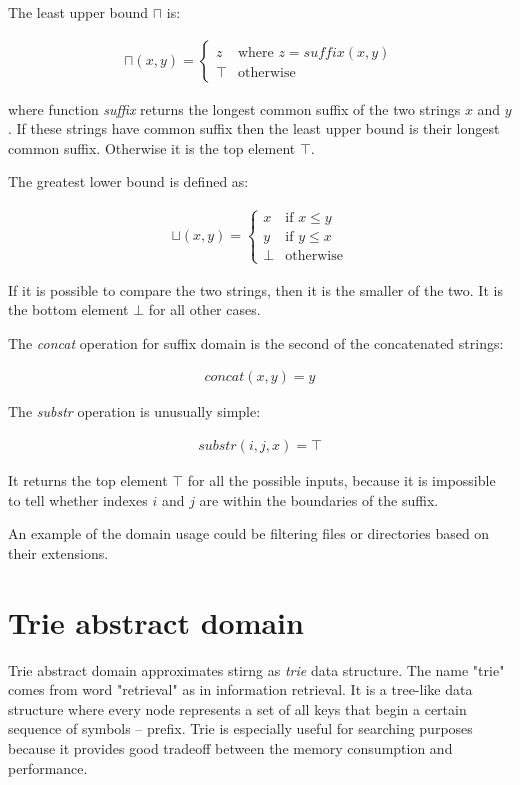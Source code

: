 \documentclass[12pt,final,oneside]{fithesis2}
\theoremstyle{definition}
\begin{document}
The least upper bound $\sqcap$ is:

\begin{align*}
\sqcap (x, y) =
\begin{cases}
z    & \text{where } z = \textit{suffix}(x,  y) \\
\top & \text{otherwise}
\end{cases}
\end{align*}

where function \textit{suffix} returns the longest common suffix of the
two strings $x$ and $y$. If these strings have common suffix then the least
upper bound is their longest common suffix. Otherwise it is the top
element $\top$.

The greatest lower bound is defined as:

\begin{align*}
\sqcup (x, y) =
\begin{cases}
x    & \text{if } x \leq y \\
y    & \text{if } y \leq x \\
\bot & \text{otherwise}
\end{cases}
\end{align*}

If it is possible to compare the two strings, then it is the smaller of the
two. It is the bottom element $\bot$ for all other cases.

The \textit{concat} operation for suffix domain is the second of the
concatenated strings:

\begin{align*}
\textit{concat}(x, y) = y
\end{align*}

The \textit{substr} operation is unusually simple:

\begin{align*}
\textit{substr}(i, j, x) = \top
\end{align*}

It returns the top element $\top$ for all the possible inputs, because
it is impossible to tell whether indexes $i$ and $j$ are within the
boundaries of the suffix.

An example of the domain usage could be filtering files or directories
based on their extensions.


\section{Trie abstract domain}

Trie abstract domain approximates stirng as \textit{trie} data structure.
The name "trie" comes from word "retrieval" as in information retrieval. It
is a tree-like data structure where every node represents a set of all keys
that begin a certain sequence of symbols -- prefix. Trie is especially useful
for searching purposes because it provides good tradeoff between the memory
consumption and performance.
\end{document}
